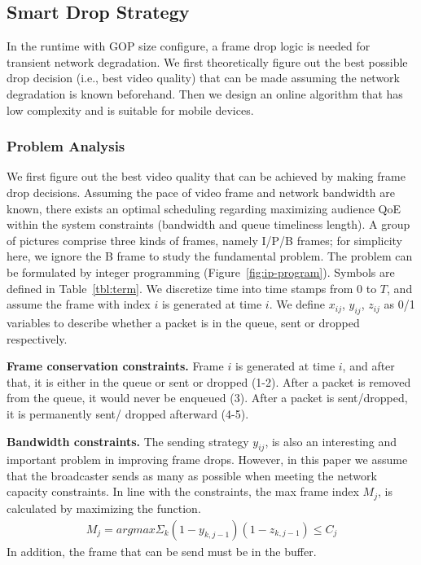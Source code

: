 \vspace{-0.05in}
\subsection{Smart Drop Strategy}
\label{subsec:drop-strategy}
In the runtime with GOP size configure, a frame drop logic is needed for transient network degradation. We first theoretically figure out the best possible drop decision (i.e., best video quality) that can be made assuming the network degradation is known beforehand. Then we design an online algorithm that has low complexity and is suitable for mobile devices.

\subsubsection{Problem Analysis}


We first figure out the best video quality that can be achieved by making frame drop decisions.
Assuming the pace of video frame and network bandwidth are known, there exists an optimal scheduling regarding maximizing audience QoE within the system constraints (bandwidth and queue timeliness length). A group of pictures comprise three kinds of frames, namely I/P/B frames; for simplicity here, we ignore the B frame to study the fundamental problem. The problem can be formulated by integer programming (Figure~\ref{fig:ip-program}). Symbols are defined in Table~\ref{tbl:term}. We discretize time into time stamps from $0$ to $T$, and assume the frame with index $i$ is generated at time $i$. We define $x_{ij}$, $y_{ij}$, $z_{ij}$ as 0/1 variables to describe whether a packet is in the queue, sent or dropped respectively.

\textbf{Frame conservation constraints.}
Frame $i$ is generated at time $i$, and after that, it is either in the queue or sent or dropped (1-2).
After a packet is removed from the queue, it would never be enqueued (3).
After a packet is sent/dropped, it is permanently sent/ dropped afterward (4-5).

\textbf{Bandwidth constraints.}
The sending strategy $y_{ij}$, is also an interesting and important problem in improving frame drops. However, in this paper we assume that the broadcaster sends as many as possible when meeting the network capacity constraints. In line with the constraints, the max frame index $M_{j}$, is calculated by maximizing the function.
\begin{align}
M_j = argmax \Sigma_k (1-y_{k,j-1})(1-z_{k,j-1}) \leq C_{j}
\end{align}
In addition, the frame that can be send must be in the buffer.

